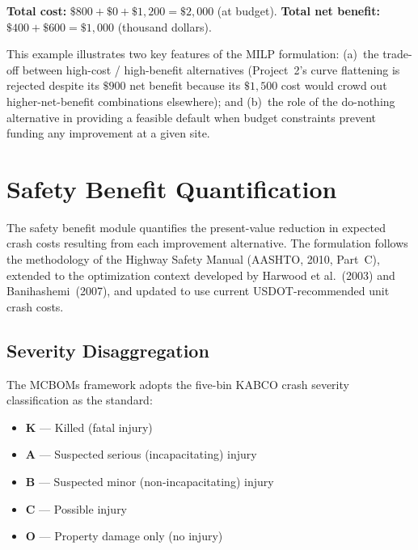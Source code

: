 \noindent \textbf{Total cost:} $\$800 + \$0 + \$1{,}200 = \$2{,}000$
(at budget). \textbf{Total net benefit:} $\$400 + \$600 = \$1{,}000$
(thousand dollars).

This example illustrates two key features of the MILP formulation:
(a)~the trade-off between high-cost / high-benefit alternatives
(Project~2's curve flattening is rejected despite its $\$900$ net benefit
because its $\$1{,}500$ cost would crowd out higher-net-benefit
combinations elsewhere); and (b)~the role of the do-nothing alternative
in providing a feasible default when budget constraints prevent funding
any improvement at a given site.

\section{Safety Benefit Quantification}
\label{sec:safety}

The safety benefit module quantifies the present-value reduction in expected
crash costs resulting from each improvement alternative. The formulation
follows the methodology of the Highway Safety Manual (AASHTO, 2010, Part~C),
extended to the optimization context developed by Harwood et al.~(2003) and
Banihashemi~(2007), and updated to use current USDOT-recommended unit crash
costs.

\subsection{Severity Disaggregation}

The MCBOMs framework adopts the five-bin KABCO crash severity classification
as the standard:
\begin{itemize}[leftmargin=2em, itemsep=2pt]
  \item \textbf{K} --- Killed (fatal injury)
  \item \textbf{A} --- Suspected serious (incapacitating) injury
  \item \textbf{B} --- Suspected minor (non-incapacitating) injury
  \item \textbf{C} --- Possible injury
  \item \textbf{O} --- Property damage only (no injury)
\end{itemize}

